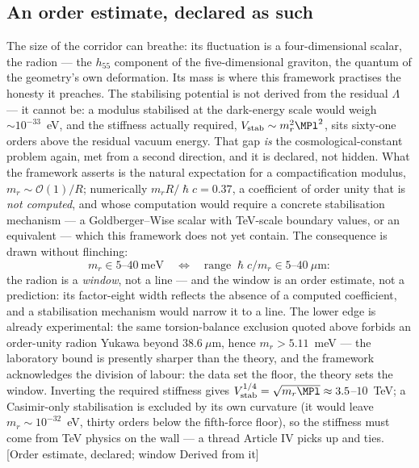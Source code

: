 \subsection{An order estimate, declared as such}
The size of the corridor can breathe: its fluctuation is a four-dimensional scalar, the radion --- the $h_{55}$ component of the five-dimensional graviton, the quantum of the geometry's own deformation. Its mass is where this framework practises the honesty it preaches. The stabilising potential is not derived from the residual $\Lambda$ --- it cannot be: a modulus stabilised at the dark-energy scale would weigh $\sim10^{-33}$~eV, and the stiffness actually required, $V_{\rm stab}\sim m_{r}^{2}\MPl^{2}$, sits sixty-one orders above the residual vacuum energy. That gap \emph{is} the cosmological-constant problem again, met from a second direction, and it is declared, not hidden. What the framework asserts is the natural expectation for a compactification modulus, $m_{r}\sim\mathcal{O}(1)/R$; numerically $m_{r}R/\hslash c=0.37$, a coefficient of order unity that is \emph{not computed}, and whose computation would require a concrete stabilisation mechanism --- a Goldberger--Wise scalar with TeV-scale boundary values, or an equivalent --- which this framework does not yet contain. The consequence is drawn without flinching:
\begin{equation}
m_{r}\in5\text{--}40~\mathrm{meV}\quad\Longleftrightarrow\quad \text{range}\;\hslash c/m_{r}\in5\text{--}40~\mu\mathrm{m}:
\end{equation}
the radion is a \emph{window}, not a line --- and the window is an order estimate, not a prediction: its factor-eight width reflects the absence of a computed coefficient, and a stabilisation mechanism would narrow it to a line. The lower edge is already experimental: the same torsion-balance exclusion quoted above forbids an order-unity radion Yukawa beyond $38.6~\mu$m, hence $m_{r}>5.11$~meV --- the laboratory bound is presently sharper than the theory, and the framework acknowledges the division of labour: the data set the floor, the theory sets the window. Inverting the required stiffness gives $V_{\rm stab}^{1/4}=\sqrt{m_{r}\MPl}\approx3.5$--$10$~TeV; a Casimir-only stabilisation is excluded by its own curvature (it would leave $m_{r}\sim10^{-32}$~eV, thirty orders below the fifth-force floor), so the stiffness must come from TeV physics on the wall --- a thread Article IV picks up and ties. [Order estimate, declared; window Derived from it]

